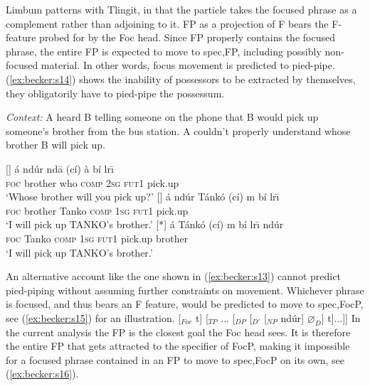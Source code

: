 \documentclass[output=paper,
modfonts
]{langscibook}
\begin{document}
Limbum patterns with Tlingit, in that the particle takes the focused phrase as a complement rather than adjoining to it. FP as a projection of F bears the F-feature probed for by the Foc head. Since FP properly contains the focused phrase, the entire FP is expected to move to spec,FP, including possibly non-focused material. In other words, focus movement is predicted to pied-pipe. (\ref{ex:becker:s14}) shows the inability of possessors to be extracted by themselves, they obligatorily have to pied-pipe the possessum.
\begin{exe}
\ex \textit{Context:} A heard B telling someone on the phone that B would pick up someone's brother from the bus station. A couldn't properly understand whose brother B will pick up.\label{ex:becker:s14}
\begin{xlist}
[]{
\gll \'a nd\'ur nd\=a (c\'i) \`a b\'i lr\={\i} \\  
     \textsc{foc} brother who \textsc{comp} \textsc{2sg} \textsc{fut1} pick.up  \\ 
\glt `Whose brother will you pick up?'}
[]{
\gll \'a {nd\'ur} T\'ank\'o  (c\'i) m b\'i lr\={\i} \\  
     \textsc{foc} {brother} Tanko \textsc{comp} \textsc{1sg} \textsc{fut1} pick.up  \\ 
\glt `I will pick up TANKO's brother.'}
[*]{
\gll \'a {Tánkó} (c\'i) m b\'i lr\={\i} {nd\'ur} \\  
     \textsc{foc}  {Tanko} \textsc{comp} \textsc{1sg} \textsc{fut1} pick.up {brother}  \\ 
\glt `I will pick up TANKO's brother.'}
\end{xlist}
\end{exe}
An alternative account like the one shown in (\ref{ex:becker:s13}) cannot predict pied-piping without assuming further constraints on movement. Whichever phrase is focused, and thus bears an F feature, would be predicted to move to spec,FocP, see (\ref{ex:becker:s15}) for an illustration.
\ea *[... \'a\sub{1} [$_{FocP}$ [$_{DP}$ Tán\tikzmark{f}kó$_F$] [$_{Foc}$ t] [$_{TP}$ ... [$_{DP}$ [$_{D'}$ [$_{NP}$ nd\'ur] $\varnothing_D$] t]...]]
	 \label{ex:becker:s15}
\z
In the current analysis the FP is the closest goal the Foc head sees. It is therefore the entire FP that gets attracted to the specifier of FocP, making it impossible for a focused phrase contained in an FP to move to spec,FocP on its own, see (\ref{ex:becker:s16}).
\end{document}
